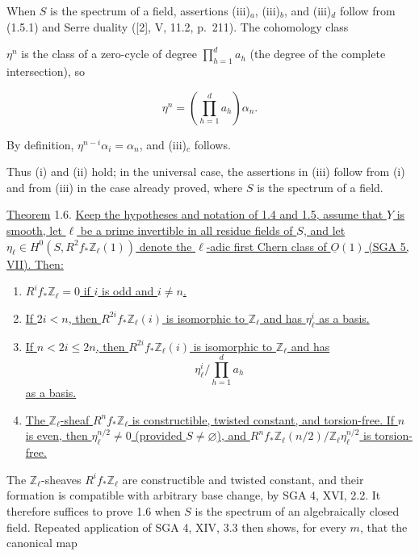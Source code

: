 When $S$ is the spectrum of a field, assertions (iii)$_a$, (iii)$_b$, and
(iii)$_d$ follow from (1.5.1) and Serre duality ([2], V, 11.2, p.~211).
The cohomology class


$\eta^n$ is the class of a zero-cycle of degree
$\prod_{h=1}^d a_h$ (the degree of the complete intersection), so

\begin{equation*}
\eta^n=\left(\prod_{h=1}^d a_h\right)\alpha_n.
\end{equation*}

By definition, $\eta^{n-i}\alpha_i=\alpha_n$, and (iii)$_c$ follows.

Thus (i) and (ii) hold; in the universal case, the assertions in (iii)
follow from (i) and from (iii) in the case already proved, where $S$ is the
spectrum of a field.

\underline{Theorem} 1.6. \underline{Keep the hypotheses and notation of
1.4 and 1.5, assume that $Y$ is smooth, let $\ell$ be a prime invertible in
all residue fields of $S$, and let
$\eta_\ell\in H^0(S,R^2f_*\mathbb Z_\ell(1))$ denote the $\ell$-adic first
Chern class of $\underline O(1)$ (SGA 5, VII).  Then:}

\begin{enumerate}[label=(\roman*),leftmargin=2.6em]
\item \underline{$R^if_*\mathbb Z_\ell=0$ if $i$ is odd and $i\ne n$.}

\item \underline{If $2i<n$, then $R^{2i}f_*\mathbb Z_\ell(i)$ is
isomorphic to $\mathbb Z_\ell$ and has $\eta_\ell^i$ as a basis.}

\item \underline{If $n<2i\leq2n$, then
$R^{2i}f_*\mathbb Z_\ell(i)$ is isomorphic to $\mathbb Z_\ell$ and has}
\begin{equation*}
\eta_\ell^i\bigg/\prod_{h=1}^d a_h
\end{equation*}
\underline{as a basis.}

\item \underline{The $\mathbb Z_\ell$-sheaf $R^nf_*\mathbb Z_\ell$ is
constructible, twisted constant, and torsion-free.  If $n$ is even, then
$\eta_\ell^{n/2}\ne0$ (provided $S\ne\varnothing$), and
$R^nf_*\mathbb Z_\ell(n/2)/\mathbb Z_\ell\eta_\ell^{n/2}$ is torsion-free.}
\end{enumerate}

The $\mathbb Z_\ell$-sheaves $R^if_*\mathbb Z_\ell$ are constructible and
twisted constant, and their formation is compatible with arbitrary base
change, by SGA 4, XVI, 2.2.  It therefore suffices to prove 1.6 when $S$ is
the spectrum of an algebraically closed field.  Repeated application of
SGA 4, XIV, 3.3 then shows, for every $m$, that the canonical map

